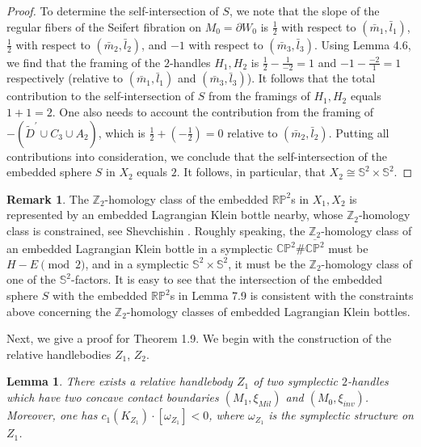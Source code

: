 \documentclass[11pt]{amsart}
\theoremstyle{plain}
\numberwithin{theorem}{section}
\newtheorem{lemma}[theorem]{Lemma}
\theoremstyle{definition}
\newtheorem{remark}[theorem]{Remark}
\newcommand{\C}{{\mathbb C}}
\newcommand{\R}{{\mathbb R}}
\newcommand{\Z}{{\mathbb Z}}
\renewcommand{\P}{{\mathbb P}}
\newcommand{\s}{{\mathbb S}}
\begin{document}
\begin{proof}
To determine the self-intersection of $S$, we note that the slope of
the regular fibers of the Seifert fibration on $M_0=\partial W_0$ is $\frac{1}{2}$ with respect to
$(\bar{m}_1,\bar{l}_1)$, $\frac{1}{2}$ with respect to $(\bar{m}_2,\bar{l}_2)$, and $-1$ with respect to
$(\bar{m}_3,\bar{l}_3)$. Using Lemma 4.6, we find that the framing of the $2$-handles $H_1,H_2$
is $\frac{1}{2}-\frac{1}{-2}=1$ and $-1-\frac{-2}{1}=1$ respectively (relative to $(\bar{m}_1,\bar{l}_1)$
and $(\bar{m}_3,\bar{l}_3)$). It follows that the total contribution to the self-intersection of $S$ from
the framings of $H_1,H_2$ equals $1+1=2$. One also needs to account the contribution from the
framing of $-(\tilde{D}^\prime\cup C_3\cup A_2)$, which is $\frac{1}{2}+(-\frac{1}{2})=0$
relative to $(\bar{m}_2,\bar{l}_2)$. Putting all contributions into consideration, we conclude that
the self-intersection of the embedded sphere $S$ in $X_2$ equals $2$. It follows, in particular,
that $X_2\cong \s^2\times \s^2$. 

\end{proof}

\begin{remark}
The $\Z_2$-homology class of the embedded $\R\P^2$s in $X_1,X_2$ is represented by an
embedded Lagrangian Klein bottle nearby, whose $\Z_2$-homology class is constrained,
see Shevchishin \cite{She}. Roughly speaking, the $\Z_2$-homology class of an embedded Lagrangian Klein bottle in a symplectic $\C\P^2\#\overline{\C\P^2}$ must be $H-E \pmod{2}$,
and in a symplectic $\s^2\times \s^2$, it must be the $\Z_2$-homology class of one of the
$\s^2$-factors. It is easy to see that the intersection of the embedded sphere $S$ with the embedded 
$\R\P^2$s in Lemma 7.9 is consistent with the constraints above concerning the $\Z_2$-homology classes of embedded Lagrangian Klein bottles. 

\end{remark}

Next, we give a proof for Theorem 1.9. We begin with the construction of the relative handlebodies $Z_1$, $Z_2$.

\begin{lemma}
There exists a relative handlebody $Z_1$ of two symplectic $2$-handles which have two concave
contact boundaries $(M_1,\xi_{Mil})$ and $(M_0,\xi_{inv})$. Moreover,  one has $c_1(K_{Z_1})\cdot [\omega_{Z_1}]<0$, where $\omega_{Z_1}$ is the symplectic structure on $Z_1$. 
\end{lemma}
\end{document}
